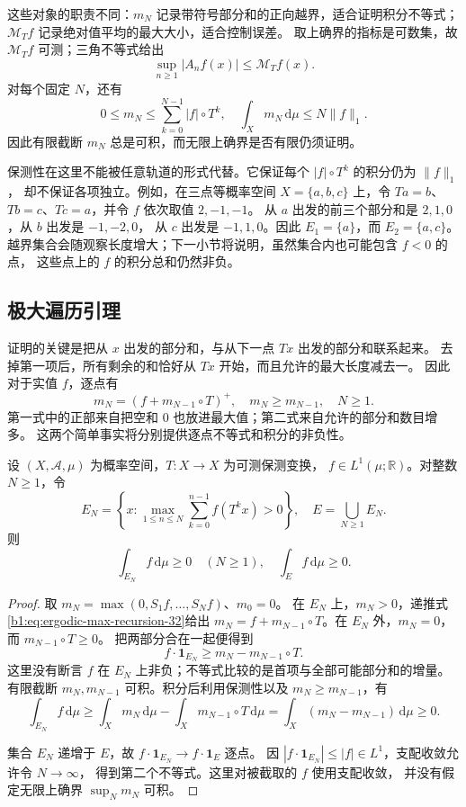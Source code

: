 这些对象的职责不同：\(m_N\) 记录带符号部分和的正向越界，适合证明积分不等式；
\(\mathcal M_Tf\) 记录绝对值平均的最大大小，适合控制误差。
取上确界的指标是可数集，故 \(\mathcal M_Tf\) 可测；三角不等式给出
\[
 \sup_{n\geq1}|A_nf(x)|\leq\mathcal M_Tf(x).
\]
对每个固定 \(N\)，还有
\[
 0\leq m_N\leq\sum_{k=0}^{N-1}|f|\circ T^k,
 \quad \int_Xm_N\,\mathrm d\mu\leq N\|f\|_1.
\]
因此有限截断 \(m_N\) 总是可积，而无限上确界是否有限仍须证明。

\ProseParagraphBreak

保测性在这里不能被任意轨道的形式代替。它保证每个 \(|f|\circ T^k\) 的积分仍为 \(\|f\|_1\)，
却不保证各项独立。例如，在三点等概率空间 \(X=\{a,b,c\}\) 上，令
\(Ta=b\)、\(Tb=c\)、\(Tc=a\)，并令 \(f\) 依次取值 \(2,-1,-1\)。
从 \(a\) 出发的前三个部分和是 \(2,1,0\)，从 \(b\) 出发是 \(-1,-2,0\)，
从 \(c\) 出发是 \(-1,1,0\)。因此 \(E_1=\{a\}\)，而 \(E_2=\{a,c\}\)。
越界集合会随观察长度增大；下一小节将说明，虽然集合内也可能包含 \(f<0\) 的点，
这些点上的 \(f\) 的积分总和仍然非负。

\subsection{极大遍历引理}
\label{b1:subsec:320302}

证明的关键是把从 \(x\) 出发的部分和，与从下一点 \(Tx\) 出发的部分和联系起来。
去掉第一项后，所有剩余的和恰好从 \(Tx\) 开始，而且允许的最大长度减去一。
因此对于实值 \(f\)，逐点有
\begin{equation}
 m_N=(f+m_{N-1}\circ T)^+,
 \quad m_N\geq m_{N-1},\quad N\geq1.
 \label{b1:eq:ergodic-max-recursion-32}
\end{equation}
第一式中的正部来自把空和 \(0\) 也放进最大值；第二式来自允许的部分和数目增多。
这两个简单事实将分别提供逐点不等式和积分的非负性。

\begin{lemma}
\label{b1:lem:maximal-ergodic-32}
设 \((X,\mathcal A,\mu)\) 为概率空间，\(T:X\to X\) 为可测保测变换，
\(f\in L^1(\mu;\mathbb R)\)。对整数 \(N\geq1\)，令
\[
 E_N=\left\{x:\max_{1\leq n\leq N}
                  \sum_{k=0}^{n-1}f(T^kx)>0\right\},
 \quad E=\bigcup_{N\geq1}E_N.
\]
则
\[
 \int_{E_N}f\,\mathrm d\mu\geq0\quad(N\geq1),
 \quad \int_Ef\,\mathrm d\mu\geq0.
\]
\end{lemma}
\begin{proof}
取 \(m_N=\max(0,S_1f,\ldots,S_Nf)\)、\(m_0=0\)。
在 \(E_N\) 上，\(m_N>0\)，递推式\eqref{b1:eq:ergodic-max-recursion-32}给出
\(m_N=f+m_{N-1}\circ T\)。在 \(E_N\) 外，\(m_N=0\)，而 \(m_{N-1}\circ T\geq0\)。
把两部分合在一起便得到
\[
 f\cdot\mathbf1_{E_N}\geq m_N-m_{N-1}\circ T.
\]
这里没有断言 \(f\) 在 \(E_N\) 上非负；不等式比较的是首项与全部可能部分和的增量。
有限截断 \(m_N,m_{N-1}\) 可积。积分后利用保测性以及 \(m_N\geq m_{N-1}\)，有
\[
 \int_{E_N}f\,\mathrm d\mu
 \geq\int_Xm_N\,\mathrm d\mu
      -\int_Xm_{N-1}\circ T\,\mathrm d\mu
 =\int_X(m_N-m_{N-1})\,\mathrm d\mu\geq0.
\]

集合 \(E_N\) 递增于 \(E\)，故 \(f\cdot\mathbf1_{E_N}\to f\cdot\mathbf1_E\) 逐点。
因 \(|f\cdot\mathbf1_{E_N}|\leq|f|\in L^1\)，支配收敛允许令 \(N\to\infty\)，
得到第二个不等式。这里对被截取的 \(f\) 使用支配收敛，
并没有假定无限上确界 \(\sup_Nm_N\) 可积。
\end{proof}

